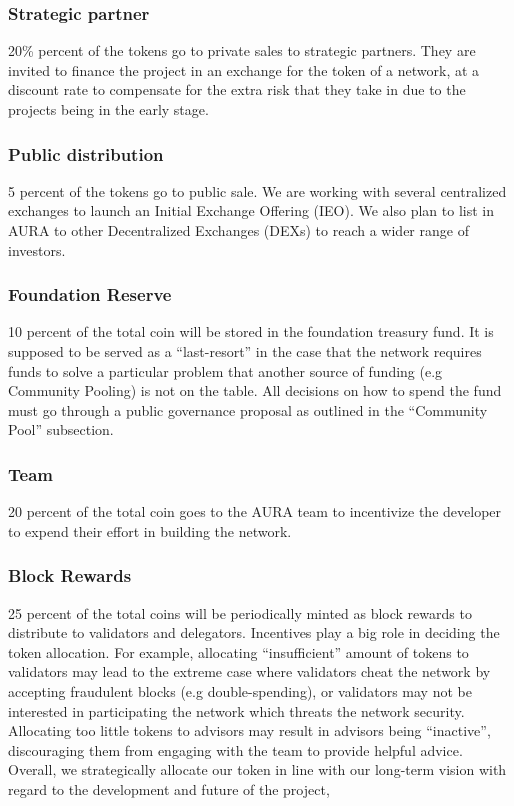 \documentclass[11pt, titlepage]{article}
\begin{document}
\subsubsection{Strategic partner}
20\% percent of the tokens go to private sales to strategic partners. They are invited to finance the project in an exchange for the token of a network, at a discount rate to compensate for the extra risk that they take in due to the projects being in the early stage.
 
\subsubsection{Public distribution}
5 percent of the tokens go to public sale. We are working with several centralized exchanges to launch an Initial Exchange Offering (IEO). We also plan to list in AURA to other Decentralized Exchanges (DEXs) to reach a wider range of investors. 

\subsubsection{Foundation Reserve}
10 percent of the total coin will be stored in the foundation treasury fund. It is supposed to be served as a “last-resort” in the case that the network requires funds to solve a particular problem that another source of funding (e.g Community Pooling) is not on the table. All decisions on how to spend the fund must go through a public governance proposal as outlined in the “Community Pool” subsection.
 
\subsubsection{Team}
20 percent of the total coin goes to the AURA team to incentivize the developer to expend their effort in building the network.
 
\subsubsection{Block Rewards}
25 percent of the total coins will be periodically minted as block rewards to distribute to validators and delegators. Incentives play a big role in deciding the token allocation. For example, allocating “insufficient” amount of tokens to validators may lead to the extreme case where validators cheat the network by accepting fraudulent blocks (e.g double-spending), or validators may not be interested in participating the network which threats the network security. Allocating too little tokens to advisors may result in advisors being “inactive”, discouraging them from engaging with the team to provide helpful advice. Overall, we strategically allocate our token in line with our long-term vision with regard to the development and future of the project, 
\end{document}
